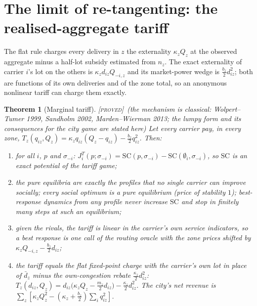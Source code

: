 \documentclass[11pt]{article}
\newtheorem{theorem}{Theorem}
\theoremstyle{definition}
\theoremstyle{remark}
\newcommand{\dbar}{\bar d}
\newcommand{\SC}{\mathrm{SC}}
\newcommand{\PROVED}{{\normalfont\textsc{[proved]}}}
\begin{document}
\section{The limit of re-tangenting: the realised-aggregate tariff}\label{sec:mct}

The flat rule charges every delivery in $z$ the externality $\kappa_zQ_z$ at the observed aggregate minus a half-lot subsidy estimated from $n_z$. The exact externality of carrier $i$'s lot on the others is $\kappa_zd_{iz}Q_{-i,z}$ and its market-power wedge is $\tfrac{b_z}{2}d_{iz}^2$; both are functions of its own deliveries and of the zone total, so an anonymous nonlinear tariff can charge them exactly.

\begin{theorem}[Marginal tariff]\label{thm:mct}\PROVED\ (the mechanism is classical: Wolpert--Tumer 1999, Sandholm 2002, Marden--Wierman 2013; the lumpy form and its consequences for the city game are stated here)
Let every carrier pay, in every zone, $T_z(q_{iz},Q_z)=\kappa_zq_{iz}(Q_z-q_{iz})-\tfrac{b_z}{2}q_{iz}^2$. Then:
\begin{enumerate}[label=(\alph*)]
\item for all $i$, $p$ and $\sigma_{-i}$: $J^T_i(p;\sigma_{-i})=\SC(p,\sigma_{-i})-\SC(\emptyset_i,\sigma_{-i})$, so $\SC$ is an exact potential of the tariff game;
\item the pure equilibria are exactly the profiles that no single carrier can improve socially; every social optimum is a pure equilibrium (price of stability $1$); best-response dynamics from any profile never increase $\SC$ and stop in finitely many steps at such an equilibrium;
\item given the rivals, the tariff is linear in the carrier's own service indicators, so a best response is one call of the routing oracle with the zone prices shifted by $\kappa_zQ_{-i,z}-\tfrac{b_z}{2}d_{iz}$;
\item the tariff equals the flat fixed-point charge with the carrier's own lot in place of $\dbar_z$ minus the own-congestion rebate $\tfrac{\kappa_z}{2}d_{iz}^2$: $T_z(d_{iz},Q_z)=d_{iz}\big(\kappa_zQ_z-\tfrac{m_z}{2}d_{iz}\big)-\tfrac{\kappa_z}{2}d_{iz}^2$. The city's net revenue is $\sum_z[\kappa_zQ_z^2-(\kappa_z+\tfrac{b_z}{2})\sum_iq_{iz}^2]$.
\end{enumerate}
\end{theorem}
\end{document}
